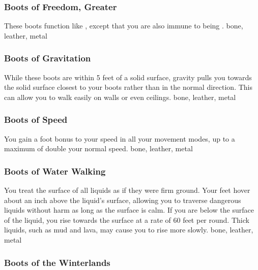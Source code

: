 \hypertarget{item:Boots of Freedom, Greater}{\subsubsection{Boots of Freedom, Greater\hfill{}}}
These boots function like , except that you are also immune to being \grappled.
 
 bone, leather, metal
\lowercase{\hypertarget{item:Boots of Gravitation}{}}\label{item:Boots of Gravitation}
\hypertarget{item:Boots of Gravitation}{\subsubsection{Boots of Gravitation\hfill{}}}
While these boots are within 5 feet of a solid surface, gravity pulls you towards the solid surface closest to your boots rather than in the normal direction.
This can allow you to walk easily on walls or even ceilings.
 
 bone, leather, metal
\lowercase{\hypertarget{item:Boots of Speed}{}}\label{item:Boots of Speed}
\hypertarget{item:Boots of Speed}{\subsubsection{Boots of Speed\hfill{}}}
You gain a  foot bonus to your speed in all your movement modes, up to a maximum of double your normal speed.
 
 bone, leather, metal
\lowercase{\hypertarget{item:Boots of Water Walking}{}}\label{item:Boots of Water Walking}
\hypertarget{item:Boots of Water Walking}{\subsubsection{Boots of Water Walking\hfill{}}}
You treat the surface of all liquids as if they were firm ground.
Your feet hover about an inch above the liquid's surface, allowing you to traverse dangerous liquids without harm as long as the surface is calm.
If you are below the surface of the liquid, you rise towards the surface at a rate of 60 feet per round.
Thick liquids, such as mud and lava, may cause you to rise more slowly.
 
 bone, leather, metal
\lowercase{\hypertarget{item:Boots of the Winterlands}{}}\label{item:Boots of the Winterlands}
\hypertarget{item:Boots of the Winterlands}{\subsubsection{Boots of the Winterlands\hfill{}}}
